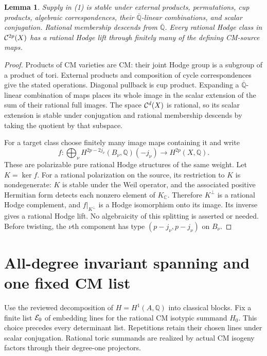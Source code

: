 \documentclass[11pt]{article}
\newcommand{\Q}{\mathbb Q}
\newcommand{\C}{\mathbb C}
\newcommand{\kk}{{\overline{\mathbb Q}}}
\newtheorem{lemma}[theorem]{Lemma}
\theoremstyle{remark}
\begin{document}
\begin{lemma}\label{lem:operations}
Supply in (1) is stable under external products, permutations, cup
products, algebraic correspondences, their $\kk$-linear combinations,
and scalar conjugation. Rational membership descends from $\kk$.
Every rational Hodge class in ${\cal C}^{2p}(X)$ has a rational Hodge
lift through finitely many of the defining CM-source maps.
\end{lemma}
\begin{proof}
Products of CM varieties are CM: their joint Hodge group is a subgroup
of a product of tori. External products and composition of cycle
correspondences give the stated operations. Diagonal pullback is cup
product. Expanding a $\kk$-linear combination of maps places its whole
image in the scalar extension of the sum of their rational full images.
The space ${\cal C}^d(X)$ is rational, so its scalar extension is stable
under conjugation and rational membership descends by taking the
quotient by that subspace.

For a target class choose finitely many image maps containing it and
write
\[
 f:\bigoplus_\nu H^{2p-2j_\nu}(B_\nu,\Q)(-j_\nu)
           \longrightarrow H^{2p}(X,\Q).
 \tag{5}\label{eq:lift}
\]
These are polarizable pure rational Hodge structures of the same weight.
Let $K=\ker f$. For a rational polarization on the source, its
restriction to $K$ is nondegenerate: $K$ is stable under the Weil
operator, and the associated positive Hermitian form detects each
nonzero element of $K_\C$. Therefore $K^\perp$ is a rational Hodge
complement, and $f|_{K^\perp}$ is a Hodge isomorphism onto its image.
Its inverse gives a rational Hodge lift. No algebraicity of this
splitting is asserted or needed.
Before twisting, the $\nu$th component has type
$(p-j_\nu,p-j_\nu)$ on $B_\nu$.
\end{proof}

\section{All-degree invariant spanning and one fixed CM list}

Use the reviewed decomposition of $H=H^1(A,\Q)$ into classical blocks.
Fix a finite list ${\cal E}_0$ of embedding lines for the rational
CM isotypic summand $H_0$. This choice precedes every determinant list.
Repetitions retain their chosen lines under scalar conjugation.
Rational toric summands are realized by actual CM isogeny factors
through their degree-one projectors.
\end{document}
